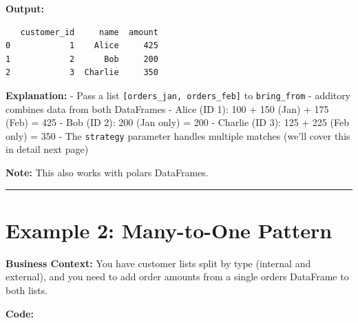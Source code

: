 \documentclass[
  letterpaper,
]{scrbook}
\begin{document}
\textbf{Output:}

\begin{verbatim}
   customer_id     name  amount
0            1    Alice     425
1            2      Bob     200
2            3  Charlie     350
\end{verbatim}

\textbf{Explanation:} - Pass a list
\texttt{{[}orders\_jan,\ orders\_feb{]}} to \texttt{bring\_from} -
additory combines data from both DataFrames - Alice (ID 1): 100 + 150
(Jan) + 175 (Feb) = 425 - Bob (ID 2): 200 (Jan only) = 200 - Charlie (ID
3): 125 + 225 (Feb only) = 350 - The \texttt{strategy} parameter handles
multiple matches (we'll cover this in detail next page)

\textbf{Note:} This also works with polars DataFrames.

\begin{center}\rule{0.5\linewidth}{0.5pt}\end{center}

\section{Example 2: Many-to-One
Pattern}\label{example-2-many-to-one-pattern}

\textbf{Business Context:} You have customer lists split by type
(internal and external), and you need to add order amounts from a single
orders DataFrame to both lists.

\textbf{Code:}
\end{document}
